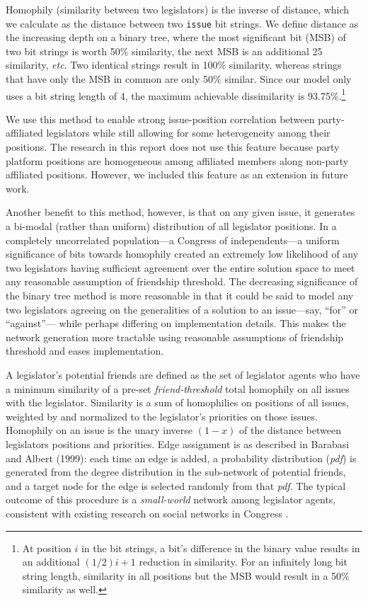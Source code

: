 \documentclass[pdftex,12pt]{llncs}
\begin{document}
Homophily (similarity between two legislators) is the inverse of distance, which we calculate as the distance between two \texttt{issue} bit strings. 
We define distance as the increasing depth on a binary tree, where the most significant bit (MSB) of two bit strings is worth 50\% similarity, the next MSB is an additional 25 similarity, \textit{etc}.  
Two identical strings result in 100\% similarity, whereas strings that have only the MSB in common are only 50\% similar.    
Since our model only uses a bit string length of 4, the maximum achievable dissimilarity is 93.75\%.\footnote{At position $i$ in the bit strings, a bit's difference in the binary value results in an additional $(1/2)i + 1$ reduction in similarity. For an infinitely long bit string length, similarity in all positions but the MSB would result in a 50\% similarity as well.}

We use this method to enable strong issue-position correlation between party-affiliated legislators while still allowing for some heterogeneity among their positions. 
The research in this report does not use this feature because party platform positions are homogeneous among affiliated members along non-party affiliated positions. 
However, we included this feature as an extension in future work.

Another benefit to this method, however, is that on any given issue, it generates a bi-modal (rather than uniform) distribution of all legislator positions. 
In a completely uncorrelated population---a Congress of independents---a uniform significance of bits towards homophily created an extremely low likelihood of any two legislators having sufficient agreement over the entire solution space to meet any reasonable assumption of friendship threshold.  
The decreasing significance of the binary tree method is more reasonable in that it could be said to model any two legislators agreeing on the generalities of a solution to an issue---say, ``for'' or ``against''--- while perhaps differing on implementation details.  
This makes the network generation more tractable using reasonable assumptions of friendship threshold and eases implementation.

A legislator's potential friends are defined as the set of legislator agents who have a minimum similarity of a pre-set \textit{friend-threshold} total homophily on all issues with the legislator.  
Similarity is a sum of homophilies on positions of all issues, weighted by and normalized to the legislator's priorities on those issues. 
Homophily on an issue is the unary inverse $(1 - x)$ of the distance between legislators positions and priorities.
Edge assignment is as described in Barabasi and Albert (1999): each time an edge is added, a probability distribution (\textit{pdf}) is generated from the degree distribution in the sub-network of potential friends, and a target node for the edge is selected randomly from that \textit{pdf}. 
The typical outcome of this procedure is a \textit{small-world} network among legislator agents, consistent with existing research on social networks in Congress \parencite{Granovetter1978}. 
\end{document}

